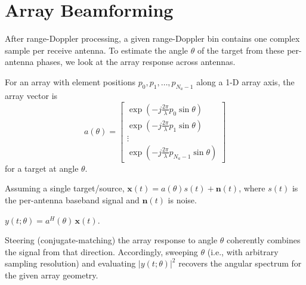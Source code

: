 \section{Array Beamforming}

After range-Doppler processing, a given range-Doppler bin contains one complex sample per receive antenna. To estimate the angle $\theta$ of the target from these per-antenna phases, we look at the array response across antennas.

\begin{definition}
For an array with element positions $p_0, p_1, \dots, p_{N_a-1}$ along a 1-D array axis, the array vector is
$$a(\theta) = \begin{bmatrix} \exp\left(-j\frac{2\pi}{\lambda}p_0\sin\theta\right) \\ \exp\left(-j\frac{2\pi}{\lambda}p_1\sin\theta\right) \\ \vdots \\ \exp\left(-j\frac{2\pi}{\lambda}p_{N_a-1}\sin\theta\right) \end{bmatrix}$$
for a target at angle $\theta$.
\end{definition}

\begin{definition}
Assuming a single target/source, $\bm{x}(t) = a(\theta)s(t) + \bm{n}(t)$, where $s(t)$ is the per-antenna baseband signal and $\bm{n}(t)$ is noise.
\end{definition}

\begin{definition}
$y(t; \theta) = a^H(\theta)\,\bm{x}(t)$.
\end{definition}

\begin{remark}
Steering (conjugate-matching) the array response to angle $\theta$ coherently combines the signal from that direction.  Accordingly, sweeping $\theta$ (i.e., with arbitrary sampling resolution) and evaluating $|y(t;\theta)|^2$ recovers the angular spectrum for the given array geometry.
\end{remark}

